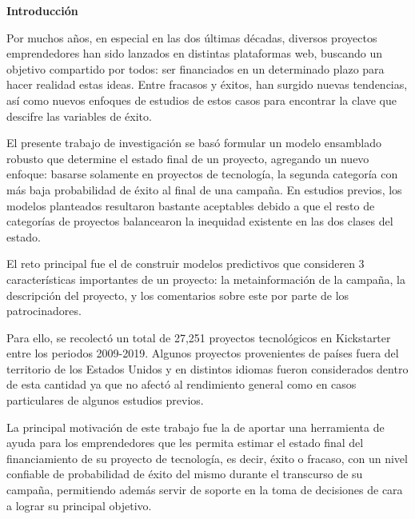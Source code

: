 \thispagestyle{plain}
\begin{center}
	{\Large \bfseries  Introducción}
\end{center}
\vspace{0.5cm}

Por muchos años, en especial en las dos últimas décadas, diversos proyectos emprendedores han sido lanzados en distintas plataformas web, buscando un objetivo compartido por todos: ser financiados en un determinado plazo para hacer realidad estas ideas. Entre fracasos y éxitos, han surgido nuevas tendencias, así como nuevos enfoques de estudios de estos casos para encontrar la clave que descifre las variables de éxito.

El presente trabajo de investigación se basó formular un modelo ensamblado robusto que determine el estado final de un proyecto, agregando un nuevo enfoque: basarse solamente en proyectos de tecnología, la segunda categoría con más baja probabilidad de éxito al final de una campaña. En estudios previos, los modelos planteados resultaron bastante aceptables debido a que el resto de categorías de proyectos balancearon la inequidad existente en las dos clases del estado.

El reto principal fue el de construir modelos predictivos que consideren 3 características importantes de un proyecto: la metainformación de la campaña, la descripción del proyecto, y los comentarios sobre este por parte de los patrocinadores.

Para ello, se recolectó un total de 27,251 proyectos tecnológicos en Kickstarter entre los periodos 2009-2019. Algunos proyectos provenientes de países fuera del territorio de los Estados Unidos y en distintos idiomas fueron considerados dentro de esta cantidad ya que no afectó al rendimiento general como en casos particulares de algunos estudios previos.

La principal motivación de este trabajo fue la de aportar una herramienta de ayuda para los emprendedores que les permita estimar el estado final del financiamiento de su proyecto de tecnología, es decir, éxito o fracaso, con un nivel confiable de probabilidad de éxito del mismo durante el transcurso de su campaña, permitiendo además servir de soporte en la toma de decisiones de cara a lograr su principal objetivo.
